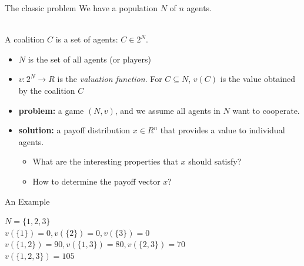 \documentclass{beamer}
\begin{document}
\begin{frame}{The classic problem}
    We have a population $N$ of $n$ agents.    
    \begin{definition} [Coalition]~\\
       A coalition $C$ is a set of agents: $C \in 2^N$.
        \begin{itemize}
            \item $N$ is the set of all agents (or players)
            \item $v:2^N \rightarrow R$ is the \emph{valuation function}. For $C \subseteq N$, $v(C)$ is the value obtained by the coalition $C$
        \end{itemize}
        \label {dfn:Coalition}
    \end{definition}
        
    \begin{itemize}        
        \item \textbf{problem:} a game $(N,v)$, and we assume all agents in $N$ want to cooperate.
        \item \textbf{solution:} a payoff distribution $x \in R^n$ that provides a value to individual agents.

        \begin{itemize}
            \item What are the interesting properties that $x$ should satisfy?
            \item How to determine the payoff vector $x$?
        \end{itemize}
            
    \end{itemize}
\end{frame}

\begin{frame}{An Example}

    \begin{center}
        $N = \{1,2,3\}$ \\
        $v(\{1\}) = 0, v(\{2\}) = 0, v(\{3\}) = 0$ \\
        $v(\{1,2\}) = 90, v(\{1,3\}) = 80, v(\{2,3\}) = 70$ \\
        $v(\{1,2,3\}) = 105$ \\
    \end{center}

\end{frame}
\end{document}
